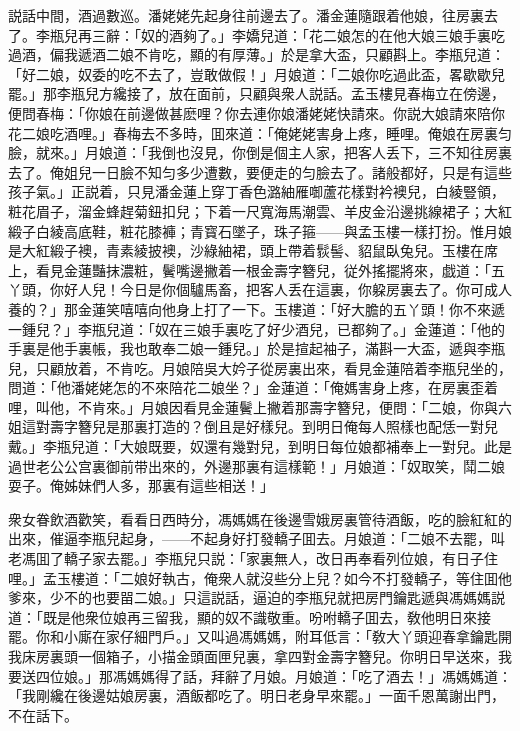 説話中間，酒過數巡。潘姥姥先起身往前邊去了。潘金蓮隨跟着他娘，往房裏去了。李瓶兒再三辭：「奴的酒夠了。」李嬌兒道：「花二娘怎的在他大娘三娘手裏吃過酒，偏我遞酒二娘不肯吃，顯的有厚薄。」於是拿大盃，只顧斟上。李瓶兒道：「好二娘，奴委的吃不去了，豈敢做假！」月娘道：「二娘你吃過此盃，畧歇歇兒罷。」那李瓶兒方纔接了，放在面前，只顧與衆人説話。孟玉樓見春梅立在傍邊，便問春梅：「你娘在前邊做甚麽哩？你去連你娘潘姥姥快請來。你説大娘請來陪你花二娘吃酒哩。」春梅去不多時，囬來道：「俺姥姥害身上疼，睡哩。俺娘在房裏匀臉，就來。」月娘道：「我倒也沒見，你倒是個主人家，把客人丢下，三不知往房裏去了。俺姐兒一日臉不知匀多少遭數，要便走的匀臉去了。諸般都好，只是有這些孩子氣。」正説着，只見潘金蓮上穿丁香色潞紬雁啣蘆花樣對衿襖兒，白綾豎領，粧花眉子，溜金蜂趕菊鈕扣兒；下着一尺寬海馬潮雲、羊皮金沿邊挑線裙子；大紅緞子白綾高底鞋，粧花膝褲；青寳石墜子，珠子箍——與孟玉樓一樣打扮。惟月娘是大紅緞子襖，青素綾披襖，沙綠紬裙，頭上帶着䯼髻、貂鼠臥兔兒。玉樓在席上，看見金蓮豔抹濃粧，鬢嘴邊撇着一根金壽字簪兒，従外搖擺將來，戯道：「五丫頭，你好人兒！今日是你個驢馬畜，把客人丢在這裏，你躱房裏去了。你可成人養的？」那金蓮笑嘻嘻向他身上打了一下。玉樓道：「好大膽的五丫頭！你不來遞一鍾兒？」李瓶兒道：「奴在三娘手裏吃了好少酒兒，已都夠了。」金蓮道：「他的手裏是他手裏帳，我也敢奉二娘一鍾兒。」於是揎起袖子，滿斟一大盃，遞與李瓶兒，只顧放着，不肯吃。月娘陪吳大妗子從房裏出來，看見金蓮陪着李瓶兒坐的，問道：「他潘姥姥怎的不來陪花二娘坐？」金蓮道：「俺媽害身上疼，在房裏歪着哩，叫他，不肯來。」月娘因看見金蓮鬢上撇着那壽字簪兒，便問：「二娘，你與六姐這對壽字簪兒是那裏打造的？倒且是好樣兒。到明日俺每人照樣也配恁一對兒戴。」李瓶兒道：「大娘既要，奴還有幾對兒，到明日每位娘都補奉上一對兒。此是過世老公公宫裏御前带出來的，外邊那裏有這樣範！」月娘道：「奴取笑，鬦二娘耍子。俺姊妹們人多，那裏有這些相送！」

衆女眷飲酒歡笑，看看日西時分，馮媽媽在後邊雪娥房裏管待酒飯，吃的臉紅紅的出來，催逼李瓶兒起身，——不起身好打發轎子囬去。月娘道：「二娘不去罷，叫老馮囬了轎子家去罷。」李瓶兒只説：「家裏無人，改日再奉看列位娘，有日子住哩。」孟玉樓道：「二娘好執古，俺衆人就沒些分上兒？如今不打發轎子，等住囬他爹來，少不的也要㽞二娘。」只這説話，逼迫的李瓶兒就把房門鑰匙遞與馮媽媽説道：「既是他衆位娘再三留我，顯的奴不識敬重。吩咐轎子囬去，敎他明日來接罷。你和小廝在家仔細門戶。」又叫過馮媽媽，附耳低言：「敎大丫頭迎春拿鑰匙開我床房裏頭一個箱子，小描金頭面匣兒裏，拿四對金壽字簪兒。你明日早送來，我要送四位娘。」那馮媽媽得了話，拜辭了月娘。月娘道：「吃了酒去！」馮媽媽道：「我剛纔在後邊姑娘房裏，酒飯都吃了。明日老身早來罷。」一面千恩萬謝出門，不在話下。

